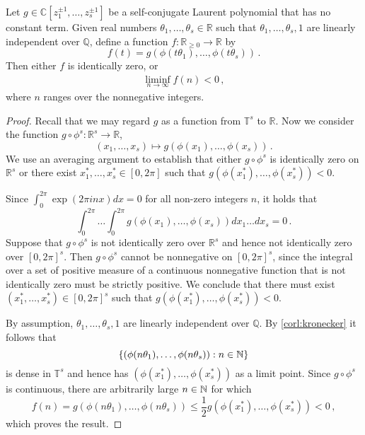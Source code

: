 \begin{proposition}
\label{first}
Let $g \in \mathbb{C}[z^{\pm 1}_1,\ldots,z^{\pm 1}_s]$ be a
self-conjugate Laurent polynomial that has no constant term.
Given real numbers $\theta_1,\ldots,\theta_s \in \mathbb{R}$ such that
$\theta_1,\ldots,\theta_s,1$ are linearly independent over
$\mathbb{Q}$, define a function
$f:\mathbb{R}_{\geq 0}\rightarrow \mathbb{R}$ by
\[ f(t) = g(\phi(t\theta_1),\ldots,\phi(t\theta_s)) \, .\]
Then either $f$ is identically zero, or
\begin{align*}
\liminf\limits_{n\rightarrow\infty} f(n) < 0 \, ,
\end{align*}
where $n$ ranges over the nonnegative integers.
\end{proposition}
\begin{proof}
  Recall that we may regard $g$ as a function from
$\mathbb{T}^s$ to $\mathbb{R}$.  Now we consider the
  function $g \circ \phi^s : \mathbb{R}^s \rightarrow \mathbb{R}$,
  \[ (x_1,\ldots,x_s) \mapsto g(\phi(x_1),\ldots,\phi(x_s)) \, . \] We
  use an averaging argument to establish that either $g\circ\phi^s$ is
  identically zero on $\mathbb{R}^s$ or there exist
  $x_1^*,\ldots,x_s^* \in [0,2\pi]$ such that
  $g(\phi(x_1^*),\ldots,\phi(x_s^*))<0$.

  Since $\int_0^{2\pi} \exp(2\pi i n x) dx=0$ for all non-zero
  integers $n$, it holds that
\begin{equation*}
\int_0^{2\pi} \ldots \int_0^{2\pi}
g(\phi(x_1),\ldots,\phi(x_s))
dx_1 \ldots dx_s =0 \, .
\end{equation*}
%
Suppose that
$g\circ \phi^s$ is not identically zero over
$\mathbb{R}^s$ and hence not identically zero over $[0,2\pi]^{s}$.
Then $g\circ \phi^s$ cannot be nonnegative on $[0,2\pi]^{s}$, since
the integral over a set of positive measure of a continuous
nonnegative function that is not identically zero must be strictly
positive.  We conclude that there must exist
$(x_1^*,\ldots,x_s^*) \in [0,2\pi]^{s}$ such that
$g(\phi(x_1^*),\ldots,\phi(x_s^*))<0$.

By assumption, $\theta_1,\ldots,\theta_s,1$ are linearly
independent over $\mathbb{Q}$.  By \cref{corl:kronecker} it
follows that
\[ \{ (\phi(n\theta_1),\ldots,\phi(n\theta_s)) : n \in
  \mathbb{N} \} \] is dense in $\mathbb{T}^s$ and hence has
$(\phi(x_1^*),\ldots,\phi(x_s^*))$ as a limit point.
Since $g\circ\phi^s$ is continuous, there are
arbitrarily large $n\in\mathbb{N}$ for which
\[
f(n) = g(\phi(n\theta_1),\ldots,\phi(n\theta_s))
    \leq \textstyle\frac{1}{2} g(\phi(x_1^*),\ldots,\phi(x_s^*)) < 0 \, , \]
which proves the result.
\end{proof}

